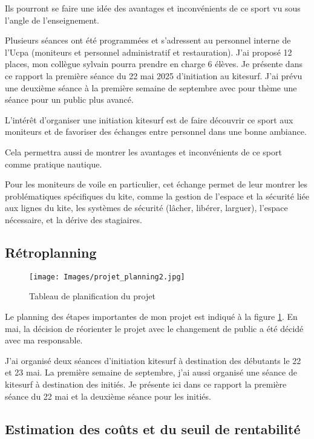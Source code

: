 \documentclass[11pt,a4paper]{report}
\begin{document}
Ils pourront se faire une idée des avantages et
inconvénients de ce sport vu sous l'angle de l'enseignement.

Plusieurs séances ont été programmées et s'adressent au personnel 
interne de l'Ucpa (moniteurs et personnel administratif et
restauration). J'ai  proposé 12 places, mon collègue sylvain
pourra prendre en charge 6 élèves.
Je présente dans ce rapport la première séance du 22 mai 2025 d'initiation 
au kitesurf. J'ai prévu une deuxième séance à la première semaine de
septembre avec pour thème une séance pour un public plus avancé.

L'intér\^et d'organiser une initiation kitesurf est de faire découvrir ce
sport aux moniteurs et de favoriser des échanges entre personnel dans 
une bonne ambiance.

Cela permettra aussi de montrer les avantages
et inconvénients de ce sport comme pratique nautique. 

Pour les moniteurs de voile en particulier, cet échange permet
de leur montrer les problématiques spécifiques du kite, 
comme la gestion de l'espace et la sécurité liée aux lignes du kite, 
les  systèmes de sécurité 
(lâcher, libérer, larguer), l'espace nécessaire, et la dérive
des stagiaires.

\subsection{Rétroplanning}
\begin{figure}[h]
\centering
\texttt{[image: Images/projet\_planning2.jpg]} 
\caption{Tableau de planification du projet \label{gantt}}
\end{figure}
Le planning des étapes importantes de mon projet est indiqué
à la figure \ref{gantt}. En mai, la décision de  réorienter 
le projet avec le changement de public a été décidé avec
ma responsable. 

J'ai organisé deux séances d'initiation kitesurf à destination des
débutants le 22 et 23 mai. La première semaine de septembre, j'ai 
aussi organisé une séance de kitesurf à destination des initiés.
Je présente ici dans ce rapport la première séance du 22 mai et la
deuxième séance pour les initiés.

\subsection{Estimation des co\^uts et du seuil de rentabilité}
\end{document}

